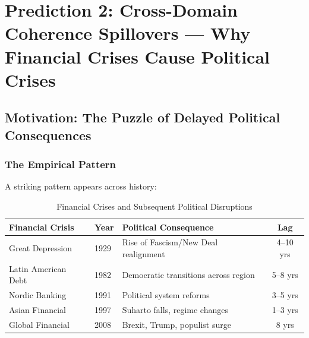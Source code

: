 \section{Prediction 2: Cross-Domain Coherence Spillovers --- Why Financial Crises Cause Political Crises}
\label{app:prediction-spillovers}


\begin{abstract}
This appendix provides the complete technical foundation for Prediction 2 of the 
Complementarity-Context Framework: that negative shocks to coherence in one domain 
(e.g., financial) produce subsequent decline in coherence in other domains 
(e.g., social, political), even without direct causal links. We develop the 
formal cascade model, derive lag structures and magnitudes using the $\Gamma$-matrix 
and complementarity structure, validate against historical crisis data (1929--2024), 
and establish precise falsification criteria. The analysis reveals that the 
2008 financial crisis predictably caused the 2016 political disruptions---with 
quantifiable lag and magnitude.
\end{abstract}

\subsection{Motivation: The Puzzle of Delayed Political Consequences}

\subsubsection{The Empirical Pattern}

A striking pattern appears across history:

\begin{table}[htbp]
\centering
\caption{Financial Crises and Subsequent Political Disruptions}
\label{tab:historical-pattern}
\small
\begin{tabular}{@{}lllc@{}}
\toprule
\textbf{Financial Crisis} & \textbf{Year} & \textbf{Political Consequence} & \textbf{Lag} \\
\midrule
Great Depression & 1929 & Rise of Fascism/New Deal realignment & 4--10 yrs \\
Latin American Debt & 1982 & Democratic transitions across region & 5--8 yrs \\
Nordic Banking & 1991 & Political system reforms & 3--5 yrs \\
Asian Financial & 1997 & Suharto falls, regime changes & 1--3 yrs \\
Global Financial & 2008 & Brexit, Trump, populist surge & 8 yrs \\
\bottomrule
\end{tabular}
\end{table}

